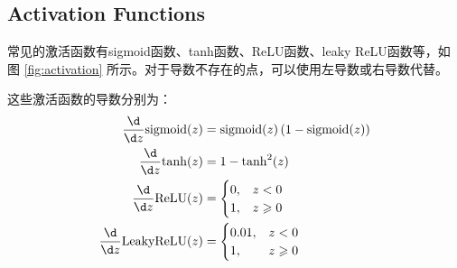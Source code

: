 \subsection{Activation Functions}

常见的激活函数有sigmoid函数、tanh函数、ReLU函数、leaky ReLU函数等，如图 \ref{fig:activation} 所示。对于导数不存在的点，可以使用左导数或右导数代替。

\begin{figure*}[h!bt]
    \centering

    \centering
    \caption{Activation Functions 激活函数}
    \label{fig:activation}
\end{figure*}

这些激活函数的导数分别为：
\begin{equation}
    \begin{aligned}
        \frac{\d }{\d z}\mathrm{sigmoid}(z) &= \mathrm{sigmoid}(z)\left(1-\mathrm{sigmoid}(z)\right) \\
        \frac{\d }{\d z}\mathrm{tanh}(z) &= 1 - \mathrm{tanh}^2(z) \\
        \frac{\d }{\d z}\mathrm{ReLU}(z) &= 
            \begin{cases}
                0, &z < 0 \\
                1, &z \geqslant 0
            \end{cases}\\
        \frac{\d }{\d z}\mathrm{LeakyReLU}(z) &= 
            \begin{cases}
                0.01, &z < 0 \\
                1, &z \geqslant 0
            \end{cases}
    \end{aligned}
\end{equation}

